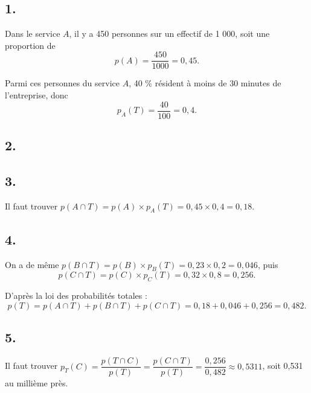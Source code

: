 \subsection*{1.}
	
	Dans le service \(A\), il y a 450 personnes sur un effectif de 1 000, soit une proportion de
	\[
	p(A) = \dfrac{450}{1000} = 0,45.
	\]
	
	Parmi ces personnes du service \(A\), 40 \% résident à moins de 30 minutes de l’entreprise, donc
	\[
	p_A(T) = \dfrac{40}{100} = 0,4.
	\]
	
	\subsection*{2.}
	
	\begin{center}
\end{center}
	
	\subsection*{3.}
	
	Il faut trouver \(p(A \cap T) = p(A) \times p_A(T) = 0,45 \times 0,4 = 0,18\).
	
	\subsection*{4.}
	
	On a de même \(p(B \cap T) = p(B) \times p_B(T) = 0,23 \times 0,2 = 0,046\), puis
	\[
	p(C \cap T) = p(C) \times p_C(T) = 0,32 \times 0,8 = 0,256.
	\]
	
	D’après la loi des probabilités totales :
	\[
	p(T) = p(A \cap T) + p(B \cap T) + p(C \cap T) = 0,18 + 0,046 + 0,256 = 0,482.
	\]
	
	\subsection*{5.}
	
	Il faut trouver \(p_T(C) = \dfrac{p(T \cap C)}{p(T)} = \dfrac{p(C \cap T)}{p(T)} = \dfrac{0,256}{0,482} \approx 0,5311\), soit 0,531 au millième près.
